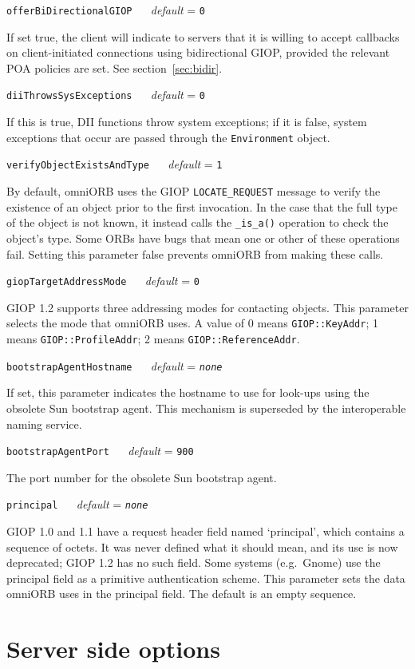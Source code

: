 \documentclass[11pt,twoside,a4paper]{book}
\makeatletter
\newcommand{\type}[1]{\texttt{#1}}
\newcommand{\code}[1]{\texttt{#1}}
\newcommand{\op}[1]{\texttt{#1()}}
\newcommand{\confopt}[2]
  {\vspace{\baselineskip}\par\noindent\code{#1} ~~ \textit{default} =
   \code{#2}}
\renewcommand{\confopt}[2]
  {\vspace{\baselineskip}\par\noindent\code{#1} ~~ \textit{default} =
   \code{#2}\\[-1ex]\@afterheading}
\makeatother
\begin{document}
\confopt{offerBiDirectionalGIOP}{0}

If set true, the client will indicate to servers that it is willing to
accept callbacks on client-initiated connections using bidirectional
GIOP, provided the relevant POA policies are set. See
section~\ref{sec:bidir}.


\confopt{diiThrowsSysExceptions}{0}

If this is true, DII functions throw system exceptions; if it is
false, system exceptions that occur are passed through the
\type{Environment} object.


\confopt{verifyObjectExistsAndType}{1}

By default, omniORB uses the GIOP \code{LOCATE\_REQUEST} message to
verify the existence of an object prior to the first invocation. In
the case that the full type of the object is not known, it instead
calls the \op{\_is\_a} operation to check the object's type. Some ORBs
have bugs that mean one or other of these operations fail. Setting
this parameter false prevents omniORB from making these calls.


\confopt{giopTargetAddressMode}{0}

GIOP 1.2 supports three addressing modes for contacting objects. This
parameter selects the mode that omniORB uses. A value of 0 means
\code{GIOP::KeyAddr}; 1 means \code{GIOP::ProfileAddr}; 2 means
\code{GIOP::ReferenceAddr}.


\confopt{bootstrapAgentHostname}{\textit{none}}

If set, this parameter indicates the hostname to use for look-ups
using the obsolete Sun bootstrap agent. This mechanism is superseded
by the interoperable naming service.


\confopt{bootstrapAgentPort}{900}

The port number for the obsolete Sun bootstrap agent.


\confopt{principal}{\textit{none}}

GIOP 1.0 and 1.1 have a request header field named `principal', which
contains a sequence of octets. It was never defined what it should
mean, and its use is now deprecated; GIOP 1.2 has no such field. Some
systems (e.g.\ Gnome) use the principal field as a primitive
authentication scheme. This parameter sets the data omniORB uses in
the principal field. The default is an empty sequence.



\section{Server side options}
\end{document}
